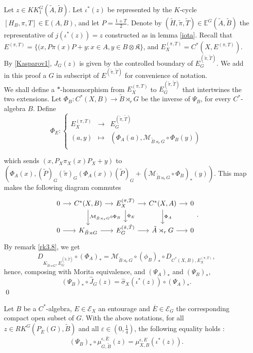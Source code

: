 \begin{dem}
Let $z\in KK_1^G(\tilde A,\tilde B)$. Let $\iota^*(z)$ be represented by the $K$-cycle $[H_{B},\pi,T]\in\mathbb E(A,B)$, and let $P=\frac{1+T}{2}$. Denote by $(\tilde H,\tilde \pi ,\tilde T)\in \mathbb E^G(\tilde A,\tilde B)$ the representative of $j(\iota^*(z))=z$ constructed as in lemma \ref{iota}. Recall that $E^{(\pi,T)} = \{(x,P\pi(x)P+y : x\in A,y\in B\otimes\mathfrak K\}$, and $E^{(\pi,T)}_X=C^*(X,E^{(\pi,T)})$. By \ref{Kasparov1}, $J_G(z)$ is given by the controlled boundary of $E_G^{(\tilde \pi,\tilde T)}$. We add in this proof a $G$ in subscript of $E^{(\tilde \pi,\tilde T)}$ for convenience of notation.\\

We shall define a $*$-homomorphism from $E^{(\pi,T)}_X$ to $E_G^{(\tilde \pi,\tilde T)}$ that intertwines the two extensions. Let $\Phi_B : C^*(X,B)\rightarrow \tilde B\rtimes_r G$ be the inverse of $\Psi_B$, for every $C^*$-algebra $B$. Define 
\[\Phi_E : \left\{
\begin{array}{rcl}
E^{(\pi,T)}_X   & \rightarrow   & E_G^{(\tilde \pi,\tilde T)} \\
(a,y)		& \mapsto	& (\Phi_A(a),\mathcal M_{\tilde B\rtimes_r G}\circ\Phi_B(y))\\
\end{array}\right.\]

which sends $(x,P_X \pi_X(x)P_X + y)$ to $(\Phi_A(x), (\tilde P)_G(\tilde \pi)_G(\Phi_A(x))(\tilde P)_G+(\mathcal M_{\tilde B\rtimes_r G}\circ\Phi_B)_*(y))$. This map makes the following diagram commutes
\[
\begin{tikzcd}[column sep = small]
0\arrow{r} & C^*(X,B) \arrow{r}\arrow{d}{\mathcal M_{\tilde B\rtimes_r G}\circ\Phi_B} & E^{(\pi,T)}_X  \arrow{r}\arrow{d}{\Phi_E} & 
	C^*(X,A)\arrow{r}\arrow{d}{\Phi_A} & 0 \\
0\arrow{r} & K_{\tilde B\rtimes G}\arrow{r} & E_G^{(\tilde \pi,\tilde T)} \arrow{r}& \tilde A\rtimes_r G\arrow{r} & 0
\end{tikzcd}.
\]
By remark \ref{rk3.8}, we get 
\[D_{K_{\tilde B\rtimes G}, E_G^{(\tilde \pi,\tilde T)}} \circ (\Phi_A)_* =\mathcal M_{\tilde B\rtimes_r G} \circ (\phi_B)_* \circ D_{ C^*(X,B), E^{(\pi,T)}_X},\]
hence, composing with Morita equivalence, and $(\Psi_A)_*$ and $(\Psi_B)_*$,
\[ (\Psi_B)_*\circ \hat J_G(z) = \hat\sigma_X(\iota^*(z)) \circ (\Psi_A)_*.\]
\qed
\end{dem}

\begin{thm}\label{BCCeq}
Let $B$ be a $C^*$-algebra, $E\in \mathcal E_X$ an entourage and $\overline E \in \mathcal E_G$ the corresponding compact open subset of $G$. With the above notations, for all $z\in RK^G(P_{\overline E}(G),\tilde B)$ and all $\varepsilon\in(0,\frac{1}{4})$, the following equality holds :
\[(\Psi_B)_*\circ\mu^{\epsilon,\overline E}_{G,\tilde B} (z) = \mu_{X,B}^{\epsilon,E}(\iota^*(z)).\]
\end{thm}

